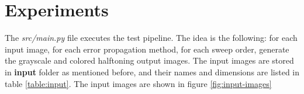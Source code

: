 \documentclass[]{IEEEtran}
\begin{document}





\section{Experiments}
The \textit{src/main.py} file executes the test pipeline. The idea is the following: for each input image, for each error propagation method, for each sweep order, generate the grayscale and colored halftoning output images. The input images are stored in \textbf{input} folder as mentioned before, and their names and dimensions are listed in table \ref{table:input}. The input images are shown in figure \ref{fig:input-images}
\end{document}
